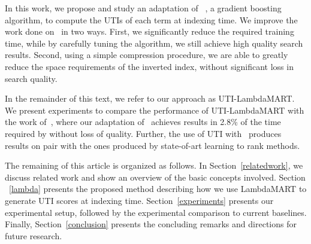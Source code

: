 \documentclass[preprint,review,10pt,3p]{elsarticle}
\begin{document}
In this work, we propose and study an adaptation of \lambdamart~\cite{wu2010lambdamart}, a gradient boosting algorithm, to compute the UTIs of each term at indexing time.
We improve the work done on \lepref\ in two ways. First, we significantly reduce the required training time, while by carefully tuning the algorithm, we still achieve high quality search results. Second, using a simple compression procedure, we are able to greatly reduce the space requirements of the inverted index, without significant loss in search quality. 

In the remainder of this text, we refer to our approach as UTI-LambdaMART. We present experiments to compare the performance of UTI-LambdaMART with the work of~\cite{costa2012lepref},
where our adaptation of \lambdamart\ achieves results in 2.8\% of the time required by \lepref %
without loss of quality. Further, the use of UTI with \lambdamart\ produces results on pair with the ones produced by state-of-art learning to rank methods.








The remaining of this article is organized as follows. In Section~\ref{relatedwork}, we discuss related work and show an overview of the basic concepts involved. Section ~\ref{lambda} presents the proposed method describing how we use LambdaMART to generate UTI scores at indexing time. Section~\ref{experiments} presents our experimental setup, followed by the experimental comparison to current baselines.
Finally, Section~\ref{conclusion} presents the concluding remarks and directions for future research.
\end{document}
